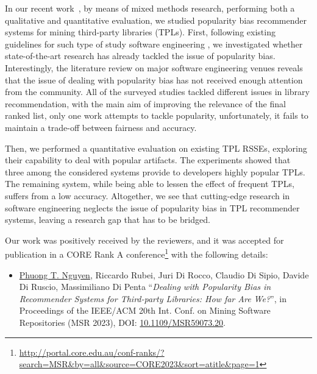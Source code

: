 In our recent work~\cite{10174041}, by means of mixed methods research, \ie performing both a qualitative and quantitative evaluation, we studied popularity bias recommender systems for mining third-party libraries (TPLs). %
First, following existing guidelines for such type of study software engineering \cite{KitchenhamBLBB11}, we investigated whether state-of-the-art research has already tackled the issue of popularity bias. %
Interestingly, the literature review on major software engineering venues reveals that the issue of dealing with popularity bias has not received enough attention from the community. All of the surveyed studies tackled different issues in library recommendation, with the main aim of improving the relevance of the final ranked list, %
only one work attempts to tackle popularity, unfortunately, it fails to maintain a trade-off between fairness and accuracy. %

Then, we performed a quantitative evaluation on \numSys existing TPL RSSEs, exploring their capability to deal with %
popular artifacts. %
The experiments showed that three among the considered systems provide to developers highly popular TPLs. The remaining system, while being able to lessen the effect of frequent TPLs, suffers from a low accuracy. Altogether, we see that cutting-edge research in software engineering neglects the issue of popularity bias in TPL recommender systems, leaving a research gap that has to be %
bridged.


Our work was positively received by the reviewers, and it was accepted for publication in a CORE Rank A conference\footnote{\url{http://portal.core.edu.au/conf-ranks/?search=MSR&by=all&source=CORE2023&sort=atitle&page=1}} with the following details: %
\begin{itemize}
	\item \small{\underline{Phuong T. Nguyen}, Riccardo Rubei, Juri Di Rocco, Claudio Di Sipio, Davide Di Ruscio, Massimiliano Di Penta ``\emph{Dealing with Popularity Bias in Recommender Systems for Third-party Libraries: How far Are We?}'', in Proceedings of the IEEE/ACM 20th Int. Conf. on Mining Software Repositories (MSR 2023), %
		DOI: \href{https://doi.org/10.1109/MSR59073.2023.00016}{10.1109/MSR59073.20}.}
\end{itemize}



